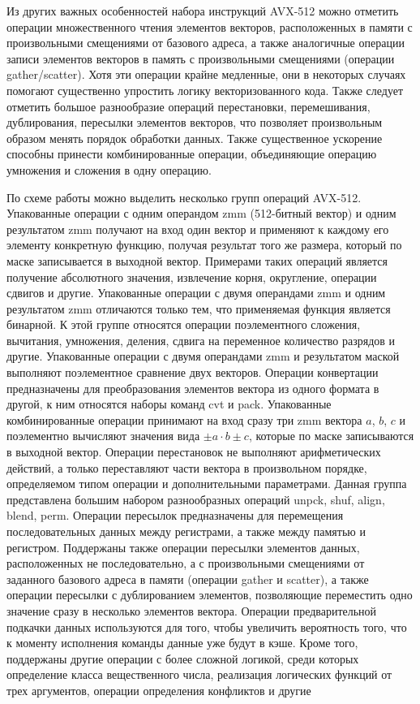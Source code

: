 Из других важных особенностей набора инструкций AVX-512 можно отметить операции множественного чтения элементов векторов, расположенных в памяти с произвольными смещениями от базового адреса, а также аналогичные операции записи элементов векторов в память с произвольными смещениями (операции gather/scatter).
Хотя эти операции крайне медленные, они в некоторых случаях помогают существенно упростить логику векторизованного кода.
Также следует отметить большое разнообразие операций перестановки, перемешивания, дублирования, пересылки элементов векторов, что позволяет произвольным образом менять порядок обработки данных.
Также существенное ускорение способны принести комбинированные операции, объединяющие операцию умножения и сложения в одну операцию.

По схеме работы можно выделить несколько групп операций AVX-512.
Упакованные операции с одним операндом zmm (512-битный вектор) и одним результатом zmm получают на вход один вектор и применяют к каждому его элементу конкретную функцию, получая результат того же размера, который по маске записывается в выходной вектор.
Примерами таких операций является получение абсолютного значения, извлечение корня, округление, операции сдвигов и другие.
Упакованные операции с двумя операндами zmm и одним результатом zmm отличаются только тем, что применяемая функция является бинарной.
К этой группе относятся операции поэлементного сложения, вычитания, умножения, деления, сдвига на переменное количество разрядов и другие.
Упакованные операции с двумя операндами zmm и результатом маской выполняют поэлементное сравнение двух векторов.
Операции конвертации предназначены для преобразования элементов вектора из одного формата в другой, к ним относятся наборы команд cvt и pack.
Упакованные комбинированные операции принимают на вход сразу три zmm вектора $a$, $b$, $c$ и поэлементно вычисляют значения вида $\pm a \cdot b \pm c$, которые по маске записываются в выходной вектор.
Операции перестановок не выполняют арифметических действий, а только переставляют части вектора в произвольном порядке, определяемом типом операции и дополнительными параметрами.
Данная группа представлена большим набором разнообразных операций unpck, shuf, align, blend, perm.
Операции пересылок предназначены для перемещения последовательных данных между регистрами, а также между памятью и регистром.
Поддержаны также операции пересылки элементов данных, расположенных не последовательно, а с произвольными смещениями от заданного базового адреса в памяти (операции gather и scatter), а также операции пересылки с дублированием элементов, позволяющие переместить одно значение сразу в несколько элементов вектора.
Операции предварительной подкачки данных используются для того, чтобы увеличить вероятность того, что к моменту исполнения команды данные уже будут в кэше.
Кроме того, поддержаны другие операции с более сложной логикой, среди которых определение класса вещественного числа, реализация логических функций от трех аргументов, операции определения конфликтов и другие

